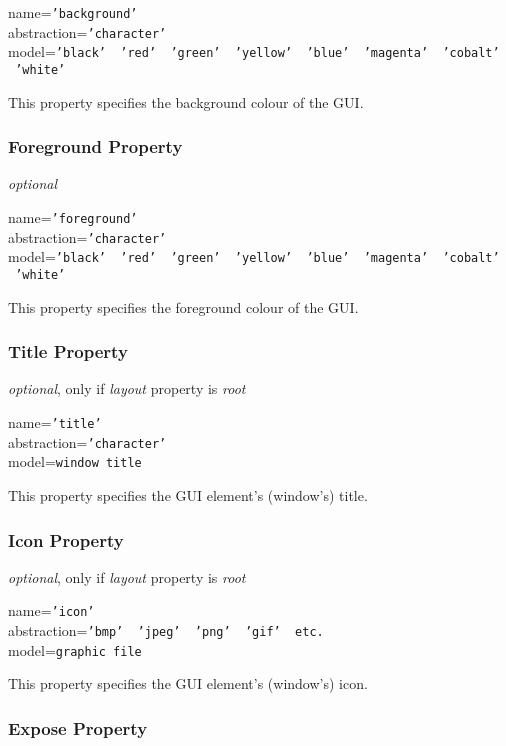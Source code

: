 name=\texttt{'background'}\\
abstraction=\texttt{'character'}\\
model=\texttt{'black' \vline\ 'red' \vline\ 'green' \vline\ 'yellow' \vline\ 'blue' \vline\ 'magenta' \vline\ 'cobalt' \vline\ 'white'}

This property specifies the background colour of the GUI.

\subsubsection{Foreground Property}

\emph{optional}

name=\texttt{'foreground'}\\
abstraction=\texttt{'character'}\\
model=\texttt{'black' \vline\ 'red' \vline\ 'green' \vline\ 'yellow' \vline\ 'blue' \vline\ 'magenta' \vline\ 'cobalt' \vline\ 'white'}

This property specifies the foreground colour of the GUI.

\subsubsection{Title Property}

\emph{optional}, only if \emph{layout} property is \emph{root}

name=\texttt{'title'}\\
abstraction=\texttt{'character'}\\
model=\texttt{window title}

This property specifies the GUI element's (window's) title.

\subsubsection{Icon Property}

\emph{optional}, only if \emph{layout} property is \emph{root}

name=\texttt{'icon'}\\
abstraction=\texttt{'bmp' \vline\ 'jpeg' \vline\ 'png' \vline\ 'gif' \vline\ etc.}\\
model=\texttt{graphic file}

This property specifies the GUI element's (window's) icon.

\subsubsection{Expose Property}

